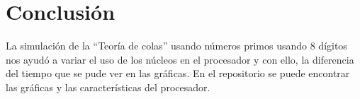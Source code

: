 \documentclass{article}
\begin{document}
\section{Conclusi\'on}

La simulaci\'on de la ``Teor\'ia de colas'' usando n\'umeros primos usando 8 d\'igitos nos ayud\'o a variar el uso de los n\'ucleos en el procesador y con ello, la diferencia del tiempo que se pude ver en las gr\'aficas.
En el repositorio\citep{yo} se puede encontrar las gr\'aficas y las caracter\'isticas del procesador.


 
\end{document}
